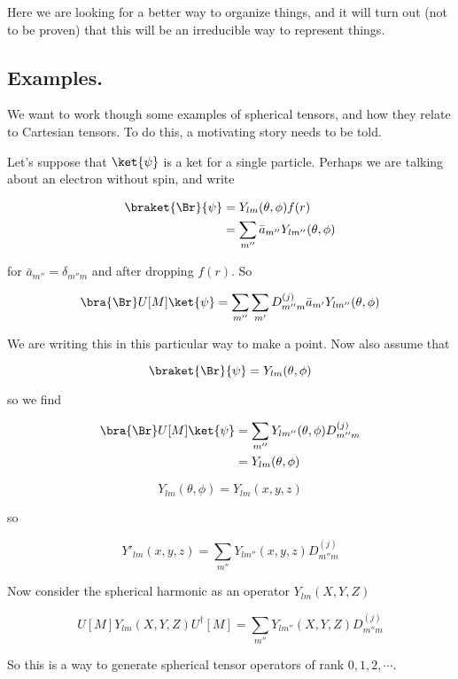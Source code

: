 Here we are looking for a better way to organize things, and it will turn out (not to be proven) that this will be an irreducible way to represent things.

\subsection{Examples.}

We want to work though some examples of spherical tensors, and how they relate to Cartesian tensors.  To do this, a motivating story needs to be told.

Let's suppose that $\ket{\psi}$ is a ket for a single particle.  Perhaps we are talking about an electron without spin, and write

\begin{align*}
\braket{\Br}{\psi} 
&= Y_{lm}(\theta, \phi) f(r) \\
&= \sum_{m''} \bar{a}_{m''} Y_{l m''}(\theta, \phi) 
\end{align*}

for $\bar{a}_{m''} = \delta_{m'' m}$ and after dropping $f(r)$.  So

\begin{equation}\label{eqn:qmTwoL19:n}
\bra{\Br} U[M] \ket{\psi} 
=
\sum_{m''} 
\sum_{m'} 
D^{(j)}_{m'' m} \bar{a}_{m'} Y_{l m''}(\theta, \phi) 
\end{equation}

We are writing this in this particular way to make a point.  Now also assume that

\begin{equation}\label{eqn:qmTwoL19:n}
\braket{\Br}{\psi} = Y_{lm}(\theta, \phi)
\end{equation}

so we find

\begin{align*}
\bra{\Br} U[M] \ket{\psi} 
&=
\sum_{m''} 
Y_{l m''}(\theta, \phi) 
D^{(j)}_{m'' m} \\
&=
Y_{l m}(\theta, \phi) 
\end{align*}

\begin{equation}\label{eqn:qmTwoL19:n}
Y_{l m}(\theta, \phi)  = Y_{lm}(x, y, z)
\end{equation}

so

\begin{equation}\label{eqn:qmTwoL19:n}
Y'_{l m}(x, y, z)
= 
\sum_{m''} 
Y_{l m''}(x, y, z)
D^{(j)}_{m'' m} 
\end{equation}

Now consider the spherical harmonic as an operator $Y_{l m}(X, Y, Z)$

\begin{equation}\label{eqn:qmTwoL19:n}
U[M] Y_{lm}(X, Y, Z) U^\dagger[M] =
\sum_{m''} 
Y_{l m''}(X, Y, Z)
D^{(j)}_{m'' m} 
\end{equation}

So this is a way to generate spherical tensor operators of rank $0, 1, 2, \cdots$.  

\EndArticle
